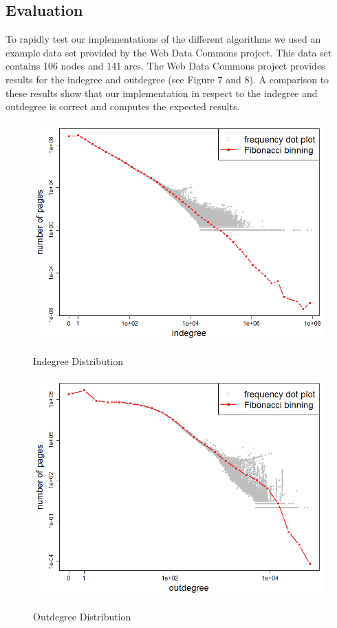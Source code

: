 \subsection{Evaluation}
To rapidly test our implementations of the different algorithms we used an example data set provided by the Web Data Commons project. This data set contains 106 nodes and 141 arcs. The Web Data Commons project provides results for the indegree and outdegree (see Figure 7 and 8). A comparison to these results show that our implementation in respect to the indegree and outdegree is correct and computes the expected results.

\begin{figure}[H]
\begin{minipage}{.5\textwidth}
	\begin{center}
		\label{fig7}		
		\includegraphics[width=1.0\textwidth]{fig7}	
		\caption{Indegree Distribution}	
	\end{center}
\end{minipage}
\begin{minipage}{.5\textwidth}
	\begin{center}
		\label{fig8}		
		\includegraphics[width=1.0\textwidth]{fig8}	
		\caption{Outdegree Distribution}	
	\end{center}
\end{minipage}
\end{figure}

